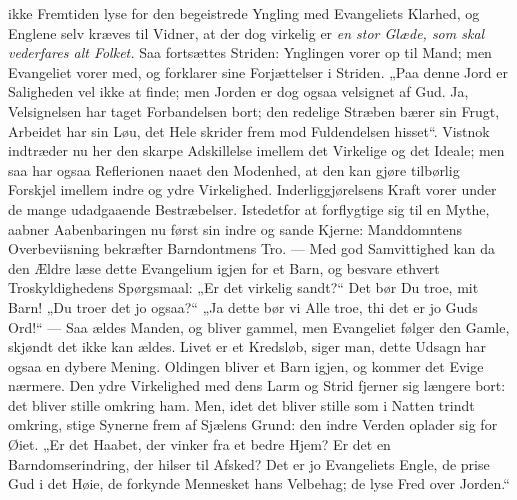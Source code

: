 \documentclass[12pt,a4paper]{book}
\begin{document}
ikke Fremtiden lyse for den begeistrede Yngling med Evangeliets Klarhed, og Englene selv
kræves til Vidner, at der dog virkelig er \emph{en stor Glæde, som skal vederfares alt
Folket.} Saa fortsættes Striden: Ynglingen vorer op til Mand; men Evangeliet vorer med,
og forklarer sine Forjættelser i Striden. „Paa denne Jord er Saligheden vel ikke at
finde; men Jorden er dog ogsaa velsignet af Gud. Ja, Velsignelsen har taget Forbandelsen
bort; den redelige Stræben bærer sin Frugt, Arbeidet har sin Løu, det Hele skrider frem
mod Fuldendelsen hisset“. Vistnok indtræder nu her den skarpe Adskillelse
imellem det Virkelige og det Ideale; men saa har ogsaa Reflerionen naaet den Modenhed,
at den kan gjøre tilbørlig Forskjel imellem indre og ydre Virkelighed. Inderliggjørelsens
Kraft vorer under de mange udadgaaende Bestræbelser. Istedetfor at forflygtige sig til
en Mythe, aabner Aabenbaringen nu først sin indre og sande Kjerne: Manddomntens
Overbeviisning bekræfter Barndontmens Tro. --- Med god Samvittighed kan da den Ældre
læse dette Evangelium igjen for et Barn, og besvare ethvert Troskyldighedens Spørgsmaal:
„Er det virkelig sandt?“ Det bør Du troe, mit Barn! „Du troer det jo ogsaa?“ „Ja dette
bør vi Alle troe, thi det er jo Guds Ord!“ --- Saa ældes Manden, og bliver gammel, men
Evangeliet følger den Gamle, skjøndt det ikke kan ældes. Livet er et Kredsløb, siger
man, dette Udsagn har ogsaa en dybere Mening. Oldingen bliver et Barn igjen, og kommer
det Evige nærmere. Den ydre Virkelighed med dens Larm og Strid fjerner sig længere bort:
det bliver stille omkring ham. Men, idet det bliver stille som i Natten trindt omkring,
stige Synerne frem af Sjælens Grund: den indre Verden oplader sig for Øiet. „Er det
Haabet, der vinker fra et bedre Hjem? Er det en Barndomserindring, der hilser til
Afsked? Det er jo Evangeliets Engle, de prise Gud i det Høie, de forkynde Mennesket hans
Velbehag; de lyse Fred over Jorden.“
\end{document}
